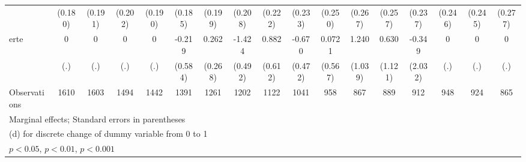 {\begin{tabular}{l*{16}{c}}
                    &     (0.180)         &     (0.191)         &     (0.202)         &     (0.190)         &     (0.185)         &     (0.199)         &     (0.208)         &     (0.222)         &     (0.233)         &     (0.250)         &     (0.267)         &     (0.257)         &     (0.237)         &     (0.246)         &     (0.245)         &     (0.277)         \\
[1em]
erte                &           0         &           0         &           0         &           0         &      -0.219         &       0.262         &      -1.424\sym{**} &       0.882         &      -0.670         &      0.0721         &       1.240         &       0.630         &      -0.349         &           0         &           0         &           0         \\
                    &         (.)         &         (.)         &         (.)         &         (.)         &     (0.584)         &     (0.268)         &     (0.492)         &     (0.612)         &     (0.472)         &     (0.567)         &     (1.039)         &     (1.121)         &     (2.032)         &         (.)         &         (.)         &         (.)         \\
\hline
Observations        &        1610         &        1603         &        1494         &        1442         &        1391         &        1261         &        1202         &        1122         &        1041         &         958         &         867         &         889         &         912         &         948         &         924         &         865         \\
\hline\hline
\multicolumn{17}{l}{\footnotesize Marginal effects; Standard errors in parentheses}\\
\multicolumn{17}{l}{\footnotesize  (d) for discrete change of dummy variable from 0 to 1}\\
\multicolumn{17}{l}{\footnotesize \sym{*} \(p<0.05\), \sym{**} \(p<0.01\), \sym{***} \(p<0.001\)}\\
\end{tabular}
}
